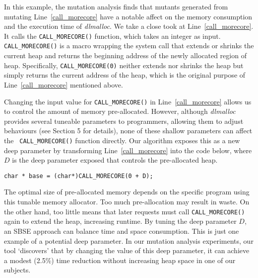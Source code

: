 In this example, the mutation analysis finds that mutants generated from mutating Line~\ref{call_morecore} have a notable affect on the memory consumption and the execution time of \emph{dlmalloc}. We take a close took at Line~\ref{call_morecore}. It calls the {\tt CALL\_MORECORE()} function, which takes an integer as input.
{\tt CALL\_MORECORE()} is a macro wrapping the system call that extends or shrinks the current heap and returns the beginning address of the newly allocated region of heap. Specifically, {\tt CALL\_MORECORE(0)} neither extends nor shrinks the heap but simply returns the current address of the heap, which is the original purpose of Line~\ref{call_morecore} mentioned above.

Changing the input value for {\tt CALL\_MORECORE()} in Line~\ref{call_morecore} 
allows us to control the amount of memory
pre-allocated. However, although \emph{dlmalloc} provides several tuneable
parameters to programmers, allowing them to adjust behaviours (see Section 5
for details), none of these shallow parameters can affect the {\tt
CALL\_MORECORE()} function directly. Our algorithm exposes this as a new
deep parameter by 
transforming Line~\ref{call_morecore} into
the code below, where $D$ is the deep parameter exposed that controls the
pre-allocated heap.
\vspace{-0.4em}
\begin{lstlisting}
char * base = (char*)CALL_MORECORE(0 + D);
\end{lstlisting}
\vspace{-0.4em}

The optimal size of pre-allocated memory depends on the specific program using this tunable memory allocator. Too much pre-allocation may result in waste. On the other hand, too little means that later requests must call {\tt CALL\_MORECORE()} again to extend the heap, increasing runtime. By tuning the deep parameter $D$, an SBSE approach can balance time and space consumption. This is just one example of a potential deep parameter. In our mutation analysis experiments, our tool `discovers' that by changing the value of this deep parameter, it can achieve a modest (2.5\%) time reduction without increasing heap space in one of our subjects.

